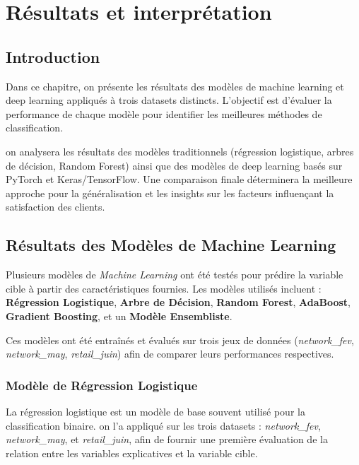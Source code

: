 \chapter{Résultats et interprétation}
\begin{spacing}{1.2}
\minitoc
\thispagestyle{MyStyle}
\end{spacing}
\newpage
\justifying

\sloppy {} 
\section{Introduction}
Dans ce chapitre, on présente les résultats des modèles de machine learning et deep learning appliqués à trois datasets distincts. L'objectif est d'évaluer la performance de chaque modèle pour identifier les meilleures méthodes de classification.

on analysera les résultats des modèles traditionnels (régression logistique, arbres de décision, Random Forest) ainsi que des modèles de deep learning basés sur PyTorch et Keras/TensorFlow. Une comparaison finale déterminera la meilleure approche pour la généralisation et les insights sur les facteurs influençant la satisfaction des clients.
\section{Résultats des Modèles de Machine Learning}

Plusieurs modèles de \textit{Machine Learning} ont été testés pour prédire la variable cible à partir des caractéristiques fournies. Les modèles utilisés incluent : \textbf{Régression Logistique}, \textbf{Arbre de Décision}, \textbf{Random Forest}, \textbf{AdaBoost}, \textbf{Gradient Boosting}, et un \textbf{Modèle Ensembliste}.

Ces modèles ont été entraînés et évalués sur trois jeux de données (\textit{network\_fev}, \textit{network\_may}, \textit{retail\_juin}) afin de comparer leurs performances respectives.

\subsection{Modèle de Régression Logistique}

La régression logistique est un modèle de base souvent utilisé pour la classification binaire. on l'a appliqué sur les trois datasets : \textit{network\_fev}, \textit{network\_may}, et \textit{retail\_juin}, afin de fournir une première évaluation de la relation entre les variables explicatives et la variable cible.

